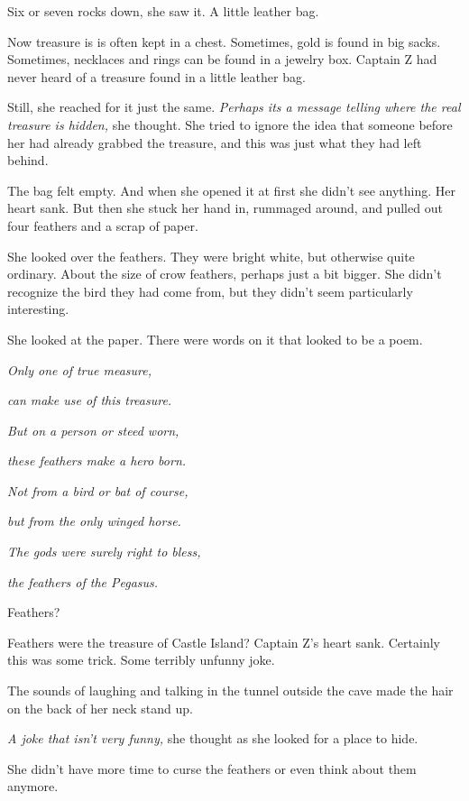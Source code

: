 \documentclass[12pt]{extbook}
\begin{document}
  Six or seven rocks down, she saw it. A little leather bag.
  
  Now treasure is is often kept in a chest. Sometimes, gold is found in
  big sacks. Sometimes, necklaces and rings can be found in a jewelry box.
  Captain Z had never heard of a treasure found in a little leather bag.
  
  Still, she reached for it just the same. \emph{Perhaps its a message
  telling where the real treasure is hidden,} she thought. She tried to
  ignore the idea that someone before her had already grabbed the
  treasure, and this was just what they had left behind.
  
  The bag felt empty. And when she opened it at first she didn't see
  anything. Her heart sank. But then she stuck her hand in, rummaged
  around, and pulled out four feathers and a scrap of paper.
  
  She looked over the feathers. They were bright white, but otherwise
  quite ordinary. About the size of crow feathers, perhaps just a bit
  bigger. She didn't recognize the bird they had come from, but they
  didn't seem particularly interesting.
  
  She looked at the paper. There were words on it that looked to be a
  poem.
  
  \emph{Only one of true measure,}
  
  \emph{can make use of this treasure.}
  
  \emph{But on a person or steed worn,}
  
  \emph{these feathers make a hero born.}
  
  \emph{Not from a bird or bat of course,}
  
  \emph{but from the only winged horse.}
  
  \emph{The gods were surely right to bless,}
  
  \emph{the feathers of the Pegasus.}
  
  Feathers?
  
  Feathers were the treasure of Castle Island? Captain Z's heart sank.
  Certainly this was some trick. Some terribly unfunny joke.
  
  The sounds of laughing and talking in the tunnel outside the cave made
  the hair on the back of her neck stand up.
  
  \emph{A joke that isn't very funny,} she thought as she looked for a
  place to hide.
  
  She didn't have more time to curse the feathers or even think about them
  anymore.
  
\end{document}
